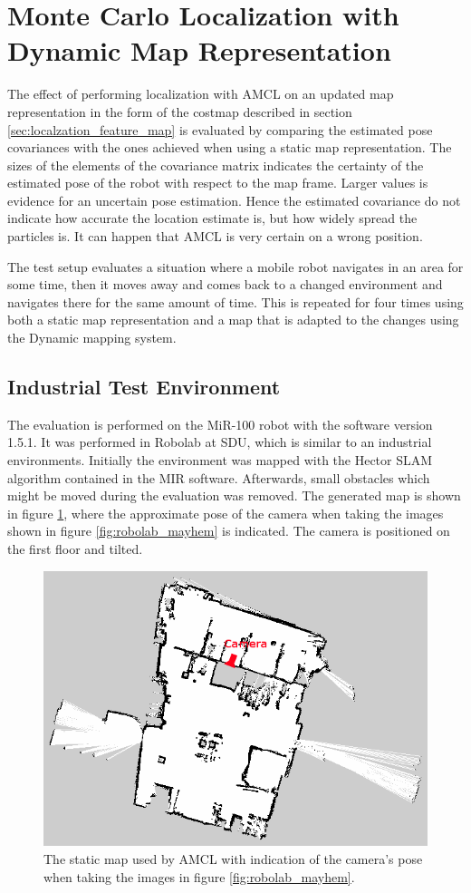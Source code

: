 \section{Monte Carlo Localization with Dynamic Map Representation}
\label{sec:amcl_dyn_map}
The effect of performing localization with AMCL on an updated map representation in the form of the costmap described in section \ref{sec:localzation_feature_map} is evaluated by comparing the estimated pose covariances with the ones achieved when using a static map representation. 
The sizes of the elements of the covariance matrix indicates the certainty of the estimated pose of the robot with respect to the map frame. 
Larger values is evidence for an uncertain pose estimation. Hence the estimated covariance do not indicate how accurate the location estimate is, but how widely spread the particles is. 
It can happen that AMCL is very certain on a wrong position. 

The test setup evaluates a situation where a mobile robot navigates in an area for some time, then it moves away and comes back to a changed environment and navigates there for the same amount of time. 
This is repeated for four times using both a static map representation and a map that is adapted to the changes using the Dynamic mapping system. 

\subsection{Industrial Test Environment}
The evaluation is performed on the MiR-100 robot with the software version 1.5.1. It was performed in Robolab at SDU, which is similar to an industrial environments. Initially the environment was mapped with the Hector SLAM algorithm contained in the MIR software. 
Afterwards, small obstacles which might be moved during the evaluation was removed.
The generated map is shown in figure \ref{fig:Robolab1_clean_with_cam}, where the approximate pose of the camera when taking the images shown in figure \ref{fig:robolab_mayhem} is indicated. 
The camera is positioned on the first floor and tilted.

\begin{figure}[tbph]
	\centering
	\includegraphics[width=0.7\linewidth]{chapters/evaluation/figures/Robolab1_clean_with_cam}
	\caption{The static map used by AMCL with indication of the camera's pose when taking the images in figure \ref{fig:robolab_mayhem}.}
	\label{fig:Robolab1_clean_with_cam}
\end{figure}

